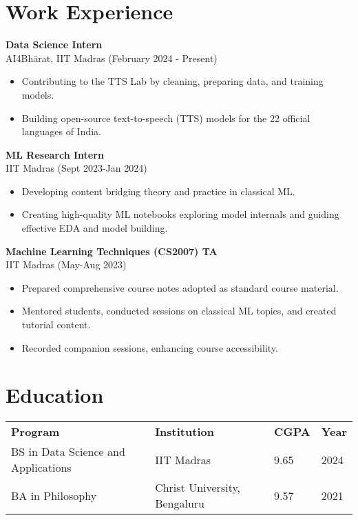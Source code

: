 \documentclass[a4paper,10pt]{article}
\begin{document}
\section*{Work Experience}
\textbf{Data Science Intern} \\
AI4Bhārat, IIT Madras (February 2024 - Present)
\begin{itemize}[noitemsep]
    \item Contributing to the TTS Lab by cleaning, preparing data, and training models.
    \item Building open-source text-to-speech (TTS) models for the 22 official languages of India.
\end{itemize}
\textbf{ML Research Intern} \\
IIT Madras (Sept 2023-Jan 2024)
\begin{itemize}[noitemsep]
    \item Developing content bridging theory and practice in classical ML.
    \item Creating high-quality ML notebooks exploring model internals and guiding effective EDA and model building.
\end{itemize}
\textbf{Machine Learning Techniques (CS2007) TA} \\
IIT Madras (May-Aug 2023)
\begin{itemize}[noitemsep]
    \item Prepared comprehensive course notes adopted as standard course material.
    \item Mentored students, conducted sessions on classical ML topics, and created tutorial content.
    \item Recorded companion sessions, enhancing course accessibility.
\end{itemize}

\newpage

\section*{Education}
\begin{tabular}{llll}
    \textbf{Program} & \textbf{Institution} & \textbf{CGPA} & \textbf{Year} \\
    BS in Data Science and Applications & IIT Madras & 9.65 & 2024 \\
    BA in Philosophy & Christ University, Bengaluru & 9.57 & 2021 \\
\end{tabular}
\end{document}
